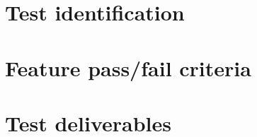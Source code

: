 \section{Test identification} \label{s:details-of-the-level-test-design:test-identification}
	\begin{comment}
		List the identifier and a brief description of each test case (or set of related test cases) in scenarios for
		this design. A particular test case, scenario, or procedure may be identified in more than one LTD. List
		the identifier and a brief description of each procedure associated with this LTD.
	\end{comment}

\section{Feature pass/fail criteria} \label{s:details-of-the-level-test-design:feature-pass-fail-criteria}
	\begin{comment}
		Specify the criteria to be used to determine whether the feature or feature combination has passed or
		failed. This is commonly based on the number of anomalies found in each severity category(s). This
		section is not needed if it is covered by an MTP and there have been no subsequent changes to the
		criteria.
	\end{comment}
	
\section{Test deliverables} \label{s:details-of-the-level-test-design:test-deliverables}
	\begin{comment}
		Identify all information that is to be delivered by the test activity (documents, data, etc.). The following
		documents may be included:
		⎯ Level Test Plan(s)
		⎯ Level Test Design(s)
		⎯ Level Test Cases
		⎯ Level Test Procedures
		⎯ Level Test Logs
		⎯ Anomaly Reports
		⎯ Level Interim Test Status Report(s)
		⎯ Level Test Report(s)
		⎯ Master Test Report
		Test input data and test output data may be identified as deliverables. Test tools may also be included.
		If documents have been combined or eliminated, then this list will be modified accordingly.
		Describe the process of delivering the completed information to the individuals (preferably by position,
		not name) and organizational entities that will need it. This may be a reference to a Configuration
		Management Plan. This delivery process description is not required if it is covered by the MTP and
		there are no changes
	\end{comment}
	